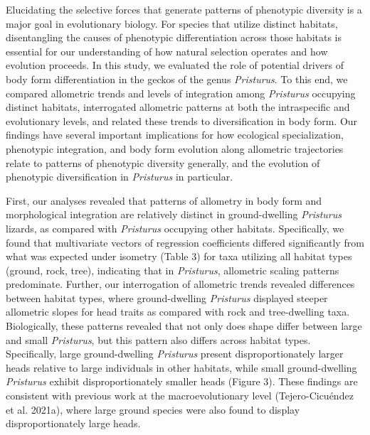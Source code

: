 \documentclass[
  11pt,
]{article}
\begin{document}
Elucidating the selective forces that generate patterns of phenotypic
diversity is a major goal in evolutionary biology. For species that
utilize distinct habitats, disentangling the causes of phenotypic
differentiation across those habitats is essential for our understanding
of how natural selection operates and how evolution proceeds. In this
study, we evaluated the role of potential drivers of body form
differentiation in the geckos of the genus \emph{Pristurus}. To this
end, we compared allometric trends and levels of integration among
\emph{Pristurus} occupying distinct habitats, interrogated allometric
patterns at both the intraspecific and evolutionary levels, and related
these trends to diversification in body form. Our findings have several
important implications for how ecological specialization, phenotypic
integration, and body form evolution along allometric trajectories
relate to patterns of phenotypic diversity generally, and the evolution
of phenotypic diversification in \emph{Pristurus} in particular.
\hfill\break

First, our analyses revealed that patterns of allometry in body form and
morphological integration are relatively distinct in ground-dwelling
\emph{Pristurus} lizards, as compared with \emph{Pristurus} occupying
other habitats. Specifically, we found that multivariate vectors of
regression coefficients differed significantly from what was expected
under isometry (Table 3) for taxa utilizing all habitat types (ground,
rock, tree), indicating that in \emph{Pristurus}, allometric scaling
patterns predominate. Further, our interrogation of allometric trends
revealed differences between habitat types, where ground-dwelling
\emph{Pristurus} displayed steeper allometric slopes for head traits as
compared with rock and tree-dwelling taxa. Biologically, these patterns
revealed that not only does shape differ between large and small
\emph{Pristurus}, but this pattern also differs across habitat types.
Specifically, large ground-dwelling \emph{Pristurus} present
disproportionately larger heads relative to large individuals in other
habitats, while small ground-dwelling \emph{Pristurus} exhibit
disproportionately smaller heads (Figure 3). These findings are
consistent with previous work at the macroevolutionary level
(Tejero-Cicuéndez et al. 2021a), where large ground species were also
found to display disproportionately large heads. \hfill\break
\end{document}
